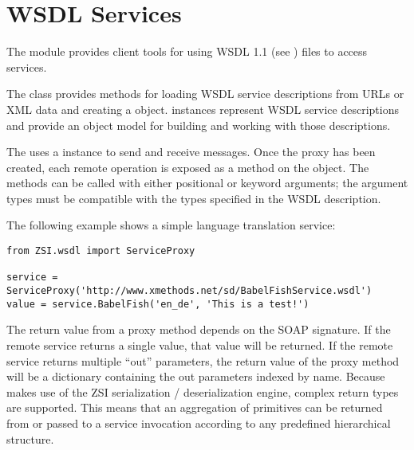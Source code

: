 \chapter{WSDL Services}

The  module provides client tools for using WSDL 1.1
(see )
files to access services.

The  class provides methods for loading WSDL service 
descriptions from URLs or XML data and creating a  object.
 instances represent WSDL service descriptions and provide 
an object model for building and working with those descriptions.

The  uses a  instance to send
and receive messages.
Once the proxy has been created, each remote operation is exposed
as a method on the object.
The methods can be called with either positional or keyword arguments;
the argument types must be compatible with the types specified in the
WSDL description.

The following example shows a simple language translation service:

\begin{verbatim}
from ZSI.wsdl import ServiceProxy

service = ServiceProxy('http://www.xmethods.net/sd/BabelFishService.wsdl')
value = service.BabelFish('en_de', 'This is a test!')
\end{verbatim}

The return value from a proxy method depends on the SOAP signature. If the 
remote service returns a single value, that value will be returned. If the 
remote service returns multiple ``out'' parameters, the return value of the 
proxy method will be a dictionary containing the out parameters indexed by 
name.  Because  makes use of the ZSI serialization / 
deserialization engine, complex return types are supported.  This means 
that an aggregation of primitives can be returned from or passed to a service
invocation according to any predefined hierarchical structure.


